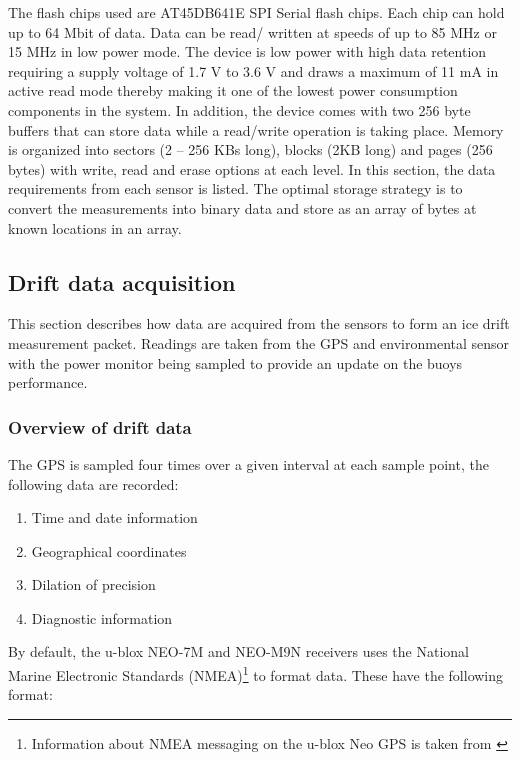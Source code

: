 The flash chips used are AT45DB641E SPI Serial flash chips. Each chip can hold up to 64 Mbit of data. Data can be read/ written at speeds of up to 85 MHz or 15 MHz in low power mode. The device is low power with high data retention requiring a supply voltage of 1.7 V to 3.6 V and draws a maximum of 11 mA in active read mode thereby making it one of the lowest power consumption components in the system. In addition, the device comes with two 256 byte buffers that can store data while a read/write operation is taking place. Memory is organized into sectors (2 – 256 KBs long), blocks (2KB long) and pages (256 bytes) with write, read and erase options at each level. In this section, the data requirements from each sensor is listed. The optimal storage strategy is to convert the measurements into binary data and store as an array of bytes at known locations in an array. \par 

\subsection{Drift data acquisition}

This section describes how data are acquired from the sensors to form an ice drift measurement packet. Readings are taken from the GPS and environmental sensor with the power monitor being sampled to provide an update on the buoys performance.\par 

\subsubsection{Overview of drift data}

The GPS is sampled four times over a given interval at each sample point, the following data are recorded:


\begin{enumerate}
	\item Time and date information
	\item Geographical coordinates
	\item Dilation of precision
	\item Diagnostic information
\end{enumerate}

By default, the u-blox NEO-7M and NEO-M9N receivers uses the National Marine Electronic Standards (NMEA)\footnote{Information about NMEA messaging on the u-blox Neo GPS is taken from \cite{UBLOX_M9N_INTERFACE}} to format data. These have the following format:


